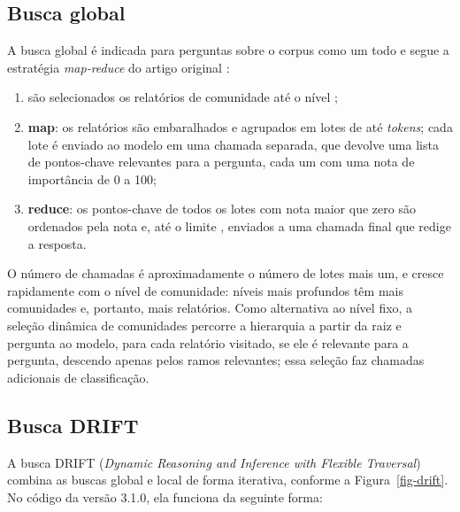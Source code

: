 \subsection{Busca global}
\label{sec-graphrag-consultas-global}

A busca global é indicada para perguntas sobre o corpus como um todo e segue a estratégia \textit{map-reduce} do artigo original \cite{edge2024global}:

\begin{enumerate}
    \item são selecionados os relatórios de comunidade até o nível ;
    \item \textbf{map}: os relatórios são embaralhados e agrupados em lotes de até  \textit{tokens}; cada lote é enviado ao modelo em uma chamada separada, que devolve uma lista de pontos-chave relevantes para a pergunta, cada um com uma nota de importância de 0 a 100;
    \item \textbf{reduce}: os pontos-chave de todos os lotes com nota maior que zero são ordenados pela nota e, até o limite , enviados a uma chamada final que redige a resposta.
\end{enumerate}

O número de chamadas é aproximadamente o número de lotes mais um, e cresce rapidamente com o nível de comunidade: níveis mais profundos têm mais comunidades e, portanto, mais relatórios. Como alternativa ao nível fixo, a seleção dinâmica de comunidades percorre a hierarquia a partir da raiz e pergunta ao modelo, para cada relatório visitado, se ele é relevante para a pergunta, descendo apenas pelos ramos relevantes; essa seleção faz chamadas adicionais de classificação.

\subsection{Busca DRIFT}
\label{sec-graphrag-consultas-drift}

A busca DRIFT (\textit{Dynamic Reasoning and Inference with Flexible Traversal}) \cite{microsoft2024drift} combina as buscas global e local de forma iterativa, conforme a Figura~\ref{fig-drift}. No código da versão 3.1.0, ela funciona da seguinte forma:

